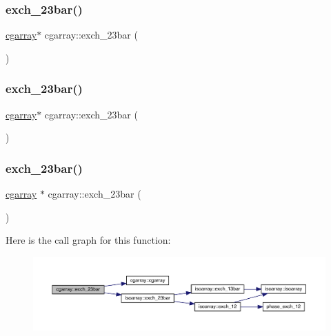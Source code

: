 \mbox{\label{classcgarray_a076528ed9996913e7017e81be6384a85}} 
\subsubsection{\texorpdfstring{exch\_23bar()}{exch\_23bar()}\hspace{0.1cm}{\footnotesize\ttfamily [1/3]}}
{\footnotesize\ttfamily \mbox{\hyperlink{classcgarray}{cgarray}}$\ast$ cgarray\+::exch\+\_\+23bar (\begin{DoxyParamCaption}{ }\end{DoxyParamCaption})}

\mbox{\label{classcgarray_a076528ed9996913e7017e81be6384a85}} 
\subsubsection{\texorpdfstring{exch\_23bar()}{exch\_23bar()}\hspace{0.1cm}{\footnotesize\ttfamily [2/3]}}
{\footnotesize\ttfamily \mbox{\hyperlink{classcgarray}{cgarray}}$\ast$ cgarray\+::exch\+\_\+23bar (\begin{DoxyParamCaption}{ }\end{DoxyParamCaption})}

\mbox{\label{classcgarray_af5c8cdf36d5e417b29162ca27805fc1b}} 
\subsubsection{\texorpdfstring{exch\_23bar()}{exch\_23bar()}\hspace{0.1cm}{\footnotesize\ttfamily [3/3]}}
{\footnotesize\ttfamily \mbox{\hyperlink{classcgarray}{cgarray}} $\ast$ cgarray\+::exch\+\_\+23bar (\begin{DoxyParamCaption}{ }\end{DoxyParamCaption})}

Here is the call graph for this function\+:
\nopagebreak
\begin{figure}[H]
\begin{center}
\leavevmode
\includegraphics[width=350pt]{d7/d55/classcgarray_af5c8cdf36d5e417b29162ca27805fc1b_cgraph}
\end{center}
\end{figure}
\mbox{\label{classcgarray_ad55c1e537d3070a732d9355ed351d53e}} 
